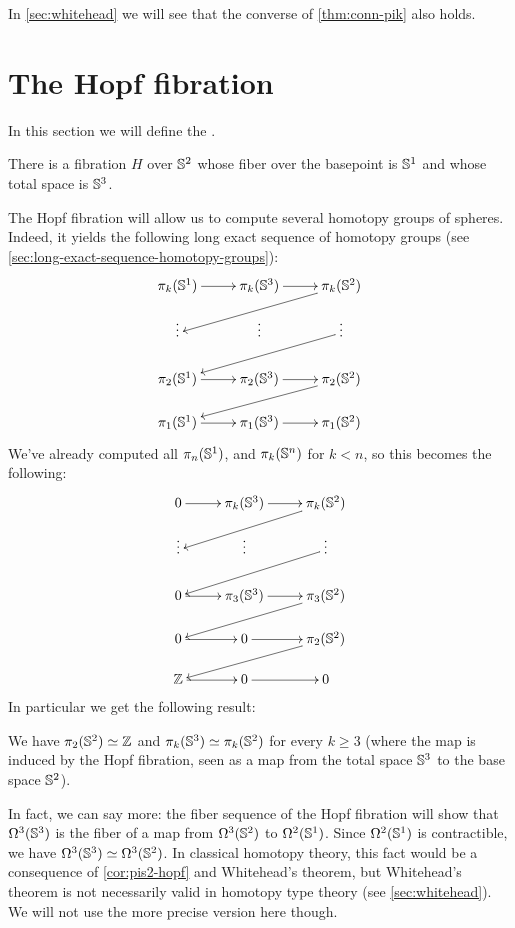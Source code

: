 In \cref{sec:whitehead} we will see that the converse of \cref{thm:conn-pik} also holds.

%
%

\section{The Hopf fibration}
\label{sec:hopf}

In this section we will define the .
%

\begin{thm}\label{thm:hopf-fibration}
There is a fibration $H$ over $\mathbb{S} ^2$ whose fiber over the basepoint is $\mathbb{S} ^1$ and
whose total space is $\mathbb{S} ^3$.
\end{thm}

The Hopf fibration will allow us to compute several homotopy groups of
spheres.
Indeed, it yields the following long exact sequence
of homotopy groups
(see
\cref{sec:long-exact-sequence-homotopy-groups}):
%
\[
\xymatrix@R=1.2pc{
  \pi_k(\Sn^1) \ar[r] & \pi_k(\Sn^3) \ar[r] & \pi_k(\Sn^2) \ar[lld] \\
  \vdots & \vdots & \vdots \ar[lld] \\
  \pi_2(\Sn^1) \ar[r] & \pi_2(\Sn^3) \ar[r] & \pi_2(\Sn^2) \ar[lld] \\
  \pi_1(\Sn^1) \ar[r] & \pi_1(\Sn^3) \ar[r] & \pi_1(\Sn^2)}
\]
%
We've already computed all $\pi_n(\mathbb{S}^1)$, and $\pi_k(\mathbb{S}^n)$ for $k<n$, so this
becomes the following:
%
\[
\xymatrix@R=1.2pc{
  0 \ar[r] & \pi_k(\Sn^3) \ar[r] & \pi_k(\Sn^2) \ar[lld] \\
  \vdots & \vdots & \vdots \ar[lld] \\
  0 \ar[r] & \pi_3(\Sn^3) \ar[r] & \pi_3(\Sn^2) \ar[lld] \\
  0 \ar[r] & 0 \ar[r] & \pi_2(\Sn^2) \ar[lld] \\
  \Z \ar[r] & 0 \ar[r] & 0}
\]
%
In particular we get the following result:

\begin{cor} \label{cor:pis2-hopf}
  We have $\pi_2(\mathbb{S}^2) \simeq \mathbb{Z}$ and $\pi_k(\mathbb{S}^3) \simeq \pi_k(\mathbb{S}^2)$ for
  every $k\ge3$ (where the map is induced by the Hopf fibration, seen as a map
  from the total space $\mathbb{S}^3$ to the base space $\mathbb{S}^2$).
\end{cor}

In fact, we can say more: the fiber sequence of the Hopf fibration will show that $\Omega^3(\mathbb{S}^3)$ is the fiber of a map from $\Omega^3(\mathbb{S}^2)$ to $\Omega^2(\mathbb{S}^1)$.
Since $\Omega^2(\mathbb{S}^1)$ is contractible, we have $\Omega^3(\mathbb{S}^3) \simeq \Omega^3(\mathbb{S}^2)$.
In classical homotopy theory, this fact would be a consequence of \cref{cor:pis2-hopf} and Whitehead's theorem, but Whitehead's theorem is not necessarily valid in homotopy type theory (see \cref{sec:whitehead}).
We will not use the more precise version here though.

